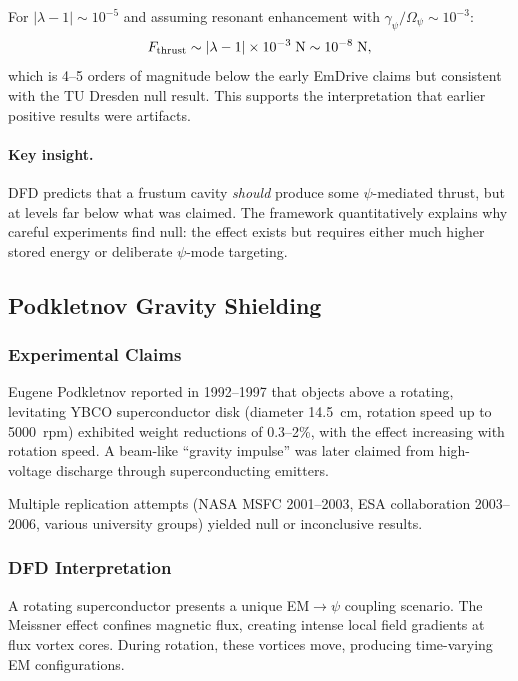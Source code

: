 \documentclass[aps,prd,twocolumn,superscriptaddress,floatfix,nofootinbib]{revtex4-2}
\newcommand{\Opsi}{\Omega_\psi}
\newcommand{\gpsi}{\gamma_\psi}
\newcommand{\lam}{\lambda}
\begin{document}
For $|\lam-1| \sim 10^{-5}$ and assuming resonant enhancement with
$\gpsi/\Opsi \sim 10^{-3}$:
\begin{equation}
F_{\rm thrust} \sim |\lam-1| \times 10^{-3}\;\si{N}
\sim 10^{-8}\;\si{N},
\end{equation}
which is 4--5 orders of magnitude below the early EmDrive claims but
consistent with the TU Dresden null result. This supports the
interpretation that earlier positive results were artifacts.

\paragraph{Key insight.}
DFD predicts that a frustum cavity \emph{should} produce some
$\psi$-mediated thrust, but at levels far below what was claimed. The
framework quantitatively explains why careful experiments find null:
the effect exists but requires either much higher stored energy or
deliberate $\psi$-mode targeting.

\subsection{Podkletnov Gravity Shielding}\label{sec:podkletnov}

\subsubsection{Experimental Claims}

Eugene Podkletnov reported in 1992--1997 that objects above a rotating,
levitating YBCO superconductor disk (diameter 14.5~cm, rotation speed
up to 5000~rpm) exhibited weight reductions of 0.3--2\%, with the
effect increasing with rotation speed. A beam-like ``gravity impulse''
was later claimed from high-voltage discharge through superconducting
emitters.

Multiple replication attempts (NASA MSFC 2001--2003, ESA collaboration
2003--2006, various university groups) yielded null or inconclusive
results.

\subsubsection{DFD Interpretation}

A rotating superconductor presents a unique EM$\to\psi$ coupling
scenario. The Meissner effect confines magnetic flux, creating intense
local field gradients at flux vortex cores. During rotation, these
vortices move, producing time-varying EM configurations.
\end{document}
